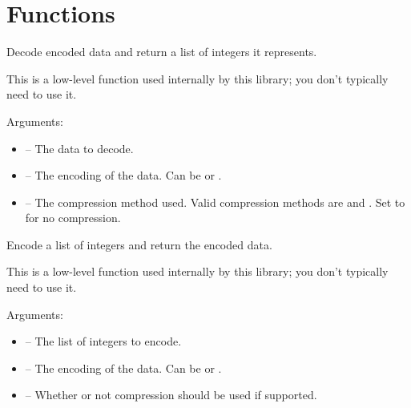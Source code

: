 \documentclass[letterpaper,10pt,english]{sphinxmanual}
\begin{document}
\chapter{Functions}
\label{index:functions}

\begin{fulllineitems}
\label{index:tmx.data_decode}
Decode encoded data and return a list of integers it represents.

This is a low-level function used internally by this library; you
don't typically need to use it.

Arguments:
\begin{itemize}
\item {} 
 -- The data to decode.

\item {} 
 -- The encoding of the data.  Can be  or
.

\item {} 
 -- The compression method used.  Valid compression
methods are  and .  Set to  for
no compression.

\end{itemize}

\end{fulllineitems}


\begin{fulllineitems}
\label{index:tmx.data_encode}
Encode a list of integers and return the encoded data.

This is a low-level function used internally by this library; you
don't typically need to use it.

Arguments:
\begin{itemize}
\item {} 
 -- The list of integers to encode.

\item {} 
 -- The encoding of the data.  Can be  or
.

\item {} 
 -- Whether or not compression should be used if
supported.

\end{itemize}

\end{fulllineitems}
\end{document}
